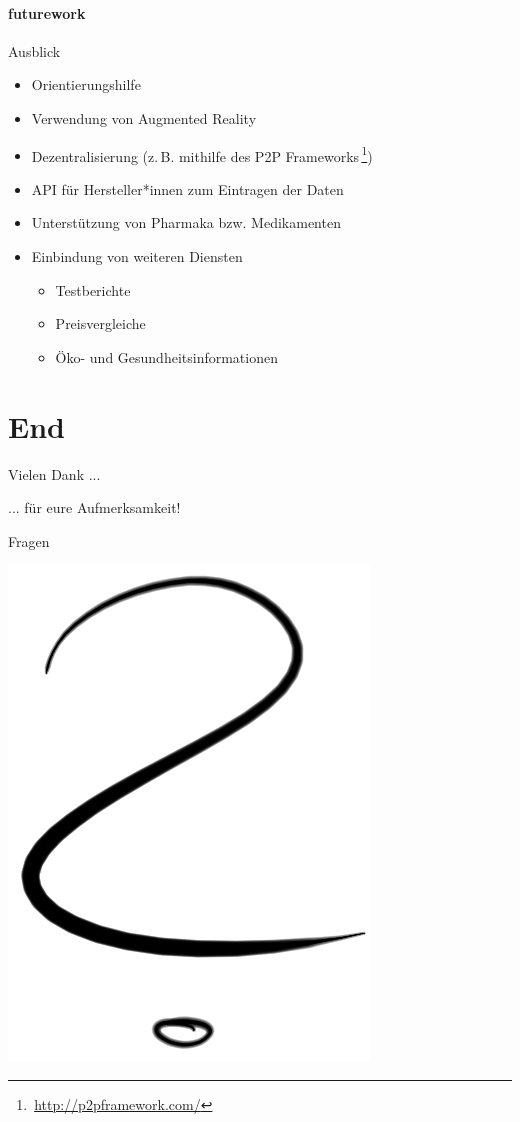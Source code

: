 \documentclass{beamer}
\begin{document}
\subsection*{futurework}
\begin{frame}{Ausblick}
	\begin{itemize}
		\item Orientierungshilfe
		\item Verwendung von Augmented Reality
		\item Dezentralisierung (z.\,B. mithilfe des P2P
				Frameworks\,\footnote{\,\url{http://p2pframework.com/}})
		\item API für Hersteller*innen zum Eintragen der Daten
		\item Unterstützung von Pharmaka bzw. Medikamenten
		\item Einbindung von weiteren Diensten
		\begin{itemize}
			\item Testberichte
			\item Preisvergleiche
			\item Öko- und Gesundheitsinformationen
		\end{itemize}
	\end{itemize}
\end{frame}

\part{End}


\begin{frame}{Vielen Dank ...}
\begin{center}
	... für eure Aufmerksamkeit!
\end{center}
\end{frame}

\begin{frame}{Fragen}
\begin{center}
	\includegraphics[scale=0.2]{pics/qm.png}
\end{center}
\end{frame}
\end{document}
